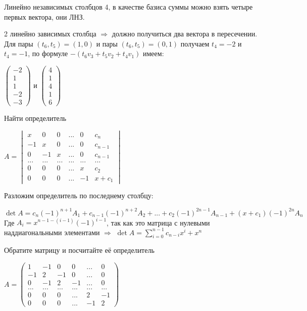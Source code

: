 \documentclass[12pt]{article}
\newenvironment{problem}[2][Problem]
{\begin{trivlist}\item[{\bfseries #1} {\bfseries #2.}]}{\end{trivlist}}
\newenvironment{solutions}[2][Solutions]
{\begin{trivlist}\item[{\bfseries #1} {\bfseries #2.}]}{\end{trivlist}}
\begin{document}
\begin{solutions}{3}
Линейно независимых столбцов 4, в качестве базиса суммы можно взять четыре первых вектора, они ЛНЗ.

2 линейно зависимых столбца $\Rightarrow$ должно получиться два вектора в пересечении. Для пары $(t_6,t_5) = (1,0)$ и пары $(t_6,t_5) = (0,1)$ получаем $t_4 = -2$ и $t_4 = -1$, по формуле $-(t_6v_3+t_5v_2+t_4v_1)$ имеем:

$\begin{pmatrix}
-2\\
1\\
1\\
-2\\
-3
\end{pmatrix}$ и 
$\begin{pmatrix}
4\\
1\\
4\\
1\\
6
\end{pmatrix}
$
\end{solutions}

\begin{problem}{4} 
Найти определитель
\begin{center}
$A =\begin{vmatrix}
x & 0 & 0 & ... & 0 & c_n\\
-1 & x & 0 & ... & 0 & c_{n-1}\\
0 & -1 & x & ... & 0 & c_{n-1}\\
... & ... & ... & ... & ... & ...\\
0 & 0 & 0 & ... & x & c_2\\
0 & 0 & 0 & ... & -1 & x+c_1
\end{vmatrix}$
\end{center}
\end{problem}

\begin{solutions}{4} 
Разложим определитель по последнему столбцу:

$\det A = c_n(-1)^{n+1}A_1 + c_{n-1}(-1)^{n+2}A_2 +...+ c_2(-1)^{2n-1}A_{n-1} + (x+c_1)(-1)^{2n}A_{n}$
Где $A_i = x^{n-1-(i-1)}(-1)^{i-1}$, так как это матрица с нулевыми наддиагональными элементами $\Rightarrow$ $\det A = \sum\limits_{i=0}^{n-1} c_{n-i} x^i+x^n$
\end{solutions}

\begin{problem}{5} 
Обратите матрицу и посчитайте её определитель
\begin{center}
$A=
\begin{pmatrix}
1 & -1 & 0 & 0 & ... & 0\\
-1 & 2 & -1 & 0 & ... & 0\\
0 & -1 & 2 & -1 & ... & 0\\
... & ... & ... & ... & ... & ...\\
0 & 0 & 0 & ... & 2 & -1\\
0 & 0 & 0 & ... & -1 & 2
\end{pmatrix}
$
\end{center}
\end{problem}
\end{document}
